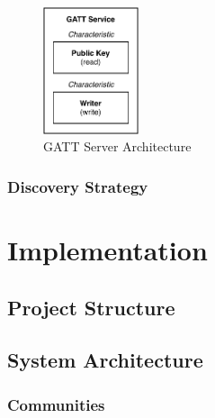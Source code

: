 \begin{figure}
    \centering
    \includegraphics[width=0.25\textwidth]{diagrams/bluetooth-gatt}
    \caption{GATT Server Architecture}
\end{figure}

\subsection{Discovery Strategy}




\chapter{Implementation}

\section{Project Structure}


\section{System Architecture}

\subsection{Communities}

